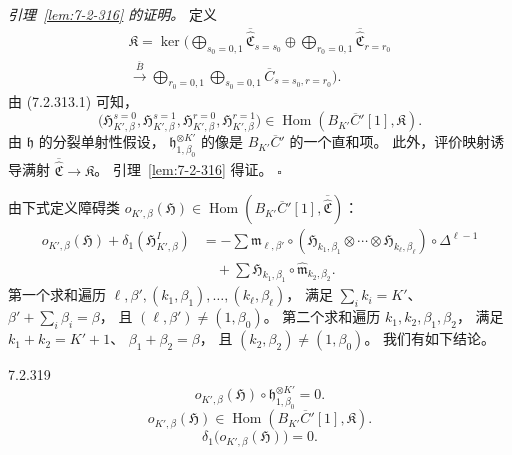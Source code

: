 \par\noindent\textit{引理~\ref{lem:7-2-316} 的证明。}
定义
\begin{multline}
\mathfrak K=\ker\Biggl(
\bigoplus_{s_0=0,1}
\overline{\widehat{\mathfrak C}}_{s=s_0}
\oplus
\bigoplus_{r_0=0,1}
\overline{\widehat{\mathfrak C}}_{r=r_0}\\
\xrightarrow{\overline B}
\bigoplus_{r_0=0,1}
\bigoplus_{s_0=0,1}
\overline C_{s=s_0,r=r_0}
\Biggr).
\tag{7.2.318}\label{eq:7-2-318}
\end{multline}
由 (7.2.313.1) 可知，
\[
\bigl(
\mathfrak H^{s=0}_{K',\beta},
\mathfrak H^{s=1}_{K',\beta},
\mathfrak H^{r=0}_{K',\beta},
\mathfrak H^{r=1}_{K',\beta}
\bigr)
\in\operatorname{Hom}
(B_{K'}\overline C'[1],\mathfrak K).
\]
由 $\mathfrak h$ 的分裂单射性假设，
$\mathfrak h_{1,\beta_0}^{\otimes K'}$
的像是
$B_{K'}\overline C'$ 的一个直和项。
此外，评价映射诱导满射
$\overline{\widehat{\mathfrak C}}\to\mathfrak K$。
引理~\ref{lem:7-2-316} 得证。
\hfill$\square$

由下式定义障碍类
$o_{K',\beta}(\mathfrak H)
\in\operatorname{Hom}
(B_{K'}\overline C'[1],
\overline{\widehat{\mathfrak C}})$：
\[
\begin{aligned}
o_{K',\beta}(\mathfrak H)
+\delta_1(\mathfrak H^I_{K',\beta})
&=-\sum\mathfrak m_{\ell,\beta'}\circ
(\mathfrak H_{k_1,\beta_1}\otimes\cdots\otimes
\mathfrak H_{k_\ell,\beta_\ell})
\circ\Delta^{\ell-1}\\
&\quad+
\sum\mathfrak H_{k_1,\beta_1}\circ
\widehat{\mathfrak m}_{k_2,\beta_2}.
\end{aligned}
\]
第一个求和遍历
$\ell,\beta',(k_1,\beta_1),\ldots,
(k_\ell,\beta_\ell)$，
满足
$\sum_i k_i=K'$、
$\beta'+\sum_i\beta_i=\beta$，
且 $(\ell,\beta')\ne(1,\beta_0)$。
第二个求和遍历
$k_1,k_2,\beta_1,\beta_2$，
满足
$k_1+k_2=K'+1$、
$\beta_1+\beta_2=\beta$，
且 $(k_2,\beta_2)\ne(1,\beta_0)$。
我们有如下结论。

\begin{lemma}{7.2.319}\label{lem:7-2-319}
\begin{equation}
o_{K',\beta}(\mathfrak H)\circ
\mathfrak h_{1,\beta_0}^{\otimes K'}=0.
\tag{7.2.320.1}\label{eq:7-2-320-1}
\end{equation}
\begin{equation}
o_{K',\beta}(\mathfrak H)
\in\operatorname{Hom}
(B_{K'}\overline C'[1],\mathfrak K).
\tag{7.2.320.2}\label{eq:7-2-320-2}
\end{equation}
\begin{equation}
\delta_1\bigl(o_{K',\beta}(\mathfrak H)\bigr)=0.
\tag{7.2.320.3}\label{eq:7-2-320-3}
\end{equation}
\end{lemma}

